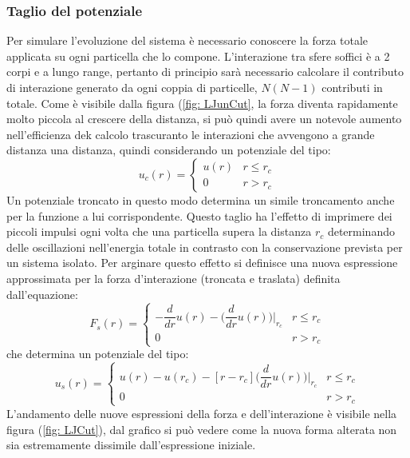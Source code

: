 \documentclass[11pt]{article}
\theoremstyle{plain}
\theoremstyle{remark}
\begin{document}
\subsubsection{Taglio del potenziale}
Per simulare l'evoluzione del sistema è necessario conoscere la forza totale applicata su ogni particella che lo compone.
L'interazione tra sfere soffici è a 2 corpi e a lungo range, pertanto di principio sarà necessario calcolare il contributo di interazione generato da ogni coppia di particelle, $N(N-1)$ contributi in totale.
Come è visibile dalla figura (\ref{fig: LJunCut}, la forza diventa rapidamente molto piccola al crescere della distanza, si può quindi avere un notevole aumento nell'efficienza dek calcolo trascuranto le interazioni che avvengono a grande distanza una distanza, quindi considerando un potenziale del tipo:
\begin{displaymath}
	u_c(r) = 
	\begin{cases}u(r) & r \leq r_c\\
	0 & r > r_c \end{cases}
\end{displaymath}
Un potenziale troncato in questo modo determina un simile troncamento anche per la funzione a lui corrispondente.
Questo taglio ha l'effetto di imprimere  dei piccoli impulsi ogni volta che una particella supera la distanza $r_c$ determinando delle oscillazioni nell'energia totale in contrasto con la conservazione prevista per un sistema isolato.
Per arginare questo effetto si definisce una nuova espressione approssimata per la forza d'interazione (troncata e traslata) definita dall'equazione:
\begin{equation}\label{eq: forza usata}
	F_{s}(r) = 
	\begin{cases}
	 -\dfrac{d}{dr} u(r) - \biggr(\dfrac{d}{dr} u(r)\biggr)\Biggr\vert_{r_c} & r \leq r_c\\
	0 & r > r_c 
	\end{cases}
\end{equation}
che determina un potenziale del tipo:
\begin{equation}\label{eq: potenziale usato}
	u_{s}(r) = 
	\begin{cases} u(r) - u(r_c) -[r -r_c]\biggr(\dfrac{d}{dr} u(r)\biggr)\Biggr\vert_{r_c} & r \leq r_c\\
	0 & r > r_c \end{cases}
\end{equation}
L'andamento delle nuove espressioni della forza e dell'interazione è visibile nella figura (\ref{fig: LJCut}), dal grafico si può vedere come la nuova forma alterata non sia estremamente dissimile dall'espressione iniziale.
\end{document}
